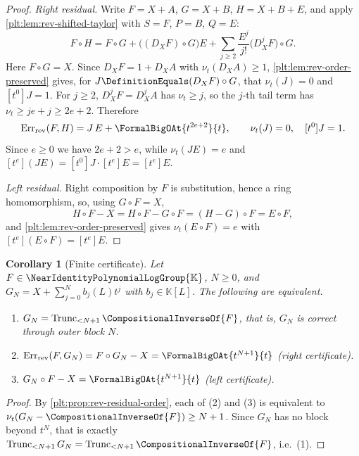 \documentclass[11pt,oneside]{article}
\theoremstyle{plain}
\newtheorem{corollary}[theorem]{Corollary}
\theoremstyle{definition}
\theoremstyle{remark}
\newcommand{\K}{\mathbb{K}}
\newcommand{\Gnear}{\NearIdentityPolynomialLogGroup{\K}} %
\newcommand{\ordt}{\nu_{t}}                              %
\newcommand{\Trunc}[2]{\operatorname{Trunc}_{<#2}#1}     %
\newcommand{\DX}{D_{X}}                                  %
\newcommand{\compose}{\mathbin{\circ}}
\newcommand{\rev}[1]{\CompositionalInverseOf{#1}}
\newcommand{\RevErr}[2]{\operatorname{Err}_{\mathrm{rev}}\!\left(#1,#2\right)}
\begin{document}
\begin{proof}
\emph{Right residual.}  Write \(F=X+A\), \(G=X+B\), \(H=X+B+E\), and apply
\cref{plt:lem:rev-shifted-taylor} with \(S=F\), \(P=B\), \(Q=E\):
\[
 F\compose H
 =F\compose G+\bigl((\DX F)\compose G\bigr)E
 +\sum_{j\ge2}\frac{E^j}{j!}\bigl(\DX^jF\bigr)\compose G .
\]
Here \(F\compose G=X\).  Since \(\DX F=1+\DX A\) with \(\ordt(\DX A)\ge1\),
\cref{plt:lem:rev-order-preserved} gives, for
\(J\DefinitionEquals(\DX F)\compose G\), that \(\ordt(J)=0\) and
\([t^0]J=1\).  For \(j\ge2\), \(\DX^jF=\DX^jA\) has \(\ordt\ge j\), so the
\(j\)-th tail term has \(\ordt\ge je+j\ge2e+2\).  Therefore
\begin{equation}\label{plt:eq:rev-residual-expansion}
 \RevErr{F}{H}=J\,E+\FormalBigOAt{t^{2e+2}}{t},
 \qquad \ordt(J)=0,\quad[t^0]J=1 .
\end{equation}
Since \(e\ge0\) we have \(2e+2>e\), while \(\ordt(JE)=e\) and
\([t^{e}](JE)=[t^0]J\cdot[t^{e}]E=[t^{e}]E\).

\emph{Left residual.}  Right composition by \(F\) is substitution, hence a ring
homomorphism, so, using \(G\compose F=X\),
\[
 H\compose F-X=H\compose F-G\compose F=(H-G)\compose F=E\compose F,
\]
and \cref{plt:lem:rev-order-preserved} gives \(\ordt(E\compose F)=e\) with
\([t^{e}](E\compose F)=[t^{e}]E\).
\end{proof}

\begin{corollary}[Finite certificate]
\label{plt:cor:rev-finite-certificate}
Let \(F\in\Gnear\), \(N\ge0\), and
\(G_N=X+\sum_{j=0}^{N}b_j(L)t^j\) with \(b_j\in\K[L]\).  The following are
equivalent.
\begin{enumerate}
\item \(G_N=\Trunc{\rev{F}}{N+1}\), that is, \(G_N\) is correct through outer
block \(N\).
\item \(\RevErr{F}{G_N}=F\compose G_N-X=\FormalBigOAt{t^{N+1}}{t}\)
\emph{(right certificate)}.
\item \(G_N\compose F-X=\FormalBigOAt{t^{N+1}}{t}\) \emph{(left certificate)}.
\end{enumerate}
\end{corollary}

\begin{proof}
By \cref{plt:prop:rev-residual-order}, each of (2) and (3) is equivalent to
\(\ordt(G_N-\rev{F})\ge N+1\).  Since \(G_N\) has no block beyond \(t^N\), that
is exactly \(\Trunc{G_N}{N+1}=\Trunc{\rev{F}}{N+1}\), i.e.\ (1).
\end{proof}
\end{document}
